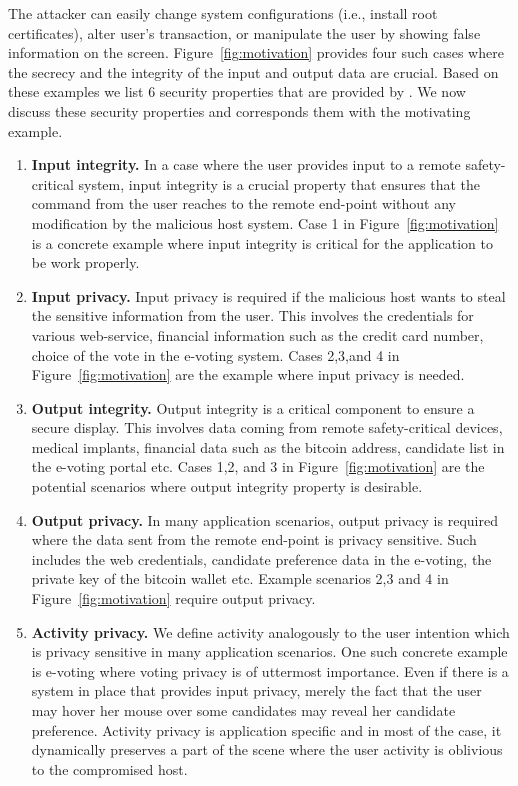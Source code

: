The attacker can easily change system configurations (i.e., install root certificates), alter user's transaction, or manipulate the user by showing false information on the screen. Figure~\ref{fig:motivation} provides four such cases where the secrecy and the integrity of the input and output data are crucial. Based on these examples we list 6 security properties that are provided by \name. We now discuss these security properties and corresponds them with the motivating example.

\begin{enumerate}
  \item \textbf{Input integrity.} In a case where the user provides input to a remote safety-critical system, input integrity is a crucial property that ensures that the command from the user reaches to the remote end-point without any modification by the malicious host system. Case 1 in Figure~\ref{fig:motivation} is a concrete example where input integrity is critical for the application to be work properly.
  \item \textbf{Input privacy.}  Input privacy is required if the malicious host wants to steal the sensitive information from the user. This involves the credentials for various web-service, financial information such as the credit card number, choice of the vote in the e-voting system. Cases 2,3,and 4 in Figure~\ref{fig:motivation} are the example where input privacy is needed.
  \item \textbf{Output integrity.} Output integrity is a critical component to ensure a secure display. This involves data coming from remote safety-critical devices, medical implants, financial data such as the bitcoin address, candidate list in the e-voting portal etc. Cases 1,2, and 3 in Figure~\ref{fig:motivation} are the potential scenarios where output integrity property is desirable.
  \item \textbf{Output privacy.} In many application scenarios, output privacy is required where the data sent from the remote end-point is privacy sensitive. Such includes the web credentials, candidate preference data in the e-voting, the private key of the bitcoin wallet etc. Example scenarios 2,3 and 4 in Figure~\ref{fig:motivation} require output privacy.
  \item \textbf{Activity privacy.} We define activity analogously to the user intention which is privacy sensitive in many application scenarios. One such concrete example is e-voting where voting privacy is of uttermost importance. Even if there is a system in place that provides input privacy, merely the fact that the user may hover her mouse over some candidates may reveal her candidate preference. Activity privacy is application specific and in most of the case, it dynamically preserves a part of the scene where the user activity is oblivious to the compromised host. 
\end{enumerate}


